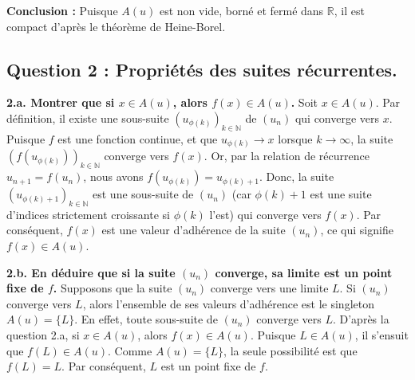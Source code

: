 \documentclass{report}
\begin{document}
\textbf{Conclusion :}
Puisque $A(u)$ est non vide, borné et fermé dans $\mathbb{R}$, il est compact d'après le théorème de Heine-Borel.

\subsection*{Question 2 : Propriétés des suites récurrentes.}

\textbf{2.a. Montrer que si $x \in A(u)$, alors $f(x) \in A(u)$.}
Soit $x \in A(u)$. Par définition, il existe une sous-suite $(u_{\phi(k)})_{k \in \mathbb{N}}$ de $(u_n)$ qui converge vers $x$.
Puisque $f$ est une fonction continue, et que $u_{\phi(k)} \to x$ lorsque $k \to \infty$, la suite $(f(u_{\phi(k)}))_{k \in \mathbb{N}}$ converge vers $f(x)$.
Or, par la relation de récurrence $u_{n+1} = f(u_n)$, nous avons $f(u_{\phi(k)}) = u_{\phi(k)+1}$.
Donc, la suite $(u_{\phi(k)+1})_{k \in \mathbb{N}}$ est une sous-suite de $(u_n)$ (car $\phi(k)+1$ est une suite d'indices strictement croissante si $\phi(k)$ l'est) qui converge vers $f(x)$.
Par conséquent, $f(x)$ est une valeur d'adhérence de la suite $(u_n)$, ce qui signifie $f(x) \in A(u)$.

\textbf{2.b. En déduire que si la suite $(u_n)$ converge, sa limite est un point fixe de $f$.}
Supposons que la suite $(u_n)$ converge vers une limite $L$.
Si $(u_n)$ converge vers $L$, alors l'ensemble de ses valeurs d'adhérence est le singleton $A(u) = \{L\}$. En effet, toute sous-suite de $(u_n)$ converge vers $L$.
D'après la question 2.a, si $x \in A(u)$, alors $f(x) \in A(u)$.
Puisque $L \in A(u)$, il s'ensuit que $f(L) \in A(u)$.
Comme $A(u) = \{L\}$, la seule possibilité est que $f(L) = L$.
Par conséquent, $L$ est un point fixe de $f$.
\end{document}
